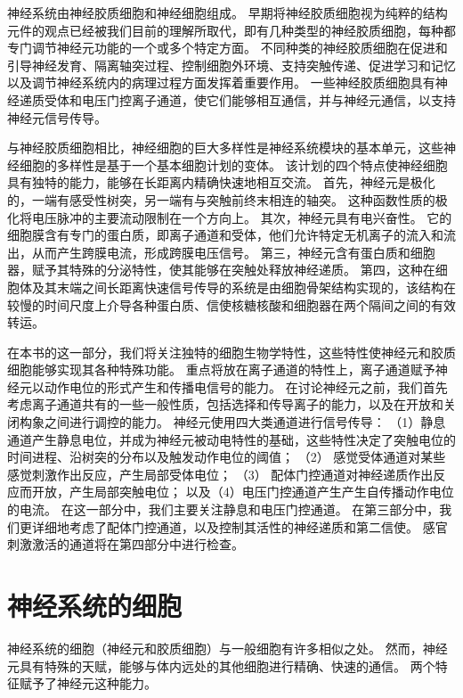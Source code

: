 神经系统由神经胶质细胞和神经细胞组成。
早期将神经胶质细胞视为纯粹的结构元件的观点已经被我们目前的理解所取代，即有几种类型的神经胶质细胞，每种都专门调节神经元功能的一个或多个特定方面。
不同种类的神经胶质细胞在促进和引导神经发育、隔离轴突过程、控制细胞外环境、支持突触传递、促进学习和记忆以及调节神经系统内的病理过程方面发挥着重要作用。
一些神经胶质细胞具有神经递质受体和电压门控离子通道，使它们能够相互通信，并与神经元通信，以支持神经元信号传导。


与神经胶质细胞相比，神经细胞的巨大多样性是神经系统模块的基本单元，这些神经细胞的多样性是基于一个基本细胞计划的变体。
该计划的四个特点使神经细胞具有独特的能力，能够在长距离内精确快速地相互交流。
首先，神经元是极化的，一端有感受性树突，另一端有与突触前终末相连的轴突。
这种函数性质的极化将电压脉冲的主要流动限制在一个方向上。
其次，神经元具有电兴奋性。
它的细胞膜含有专门的蛋白质，即离子通道和受体，他们允许特定无机离子的流入和流出，从而产生跨膜电流，形成跨膜电压信号。
第三，神经元含有蛋白质和细胞器，赋予其特殊的分泌特性，使其能够在突触处释放神经递质。
第四，这种在细胞体及其末端之间长距离快速信号传导的系统是由细胞骨架结构实现的，该结构在较慢的时间尺度上介导各种蛋白质、信使核糖核酸和细胞器在两个隔间之间的有效转运。


在本书的这一部分，我们将关注独特的细胞生物学特性，这些特性使神经元和胶质细胞能够实现其各种特殊功能。
重点将放在离子通道的特性上，离子通道赋予神经元以动作电位的形式产生和传播电信号的能力。
在讨论神经元之前，我们首先考虑离子通道共有的一些一般性质，包括选择和传导离子的能力，以及在开放和关闭构象之间进行调控的能力。
神经元使用四大类通道进行信号传导：
（1）静息通道产生静息电位，并成为神经元被动电特性的基础，这些特性决定了突触电位的时间进程、沿树突的分布以及触发动作电位的阈值；
（2） 感觉受体通道对某些感觉刺激作出反应，产生局部受体电位；
（3） 配体门控通道对神经递质作出反应而开放，产生局部突触电位；
以及（4）电压门控通道产生产生自传播动作电位的电流。
在这一部分中，我们主要关注静息和电压门控通道。
在第三部分中，我们更详细地考虑了配体门控通道，以及控制其活性的神经递质和第二信使。
感官刺激激活的通道将在第四部分中进行检查。




\chapter{神经系统的细胞} \label{chap:chap7}

神经系统的细胞（神经元和胶质细胞）与一般细胞有许多相似之处。
然而，神经元具有特殊的天赋，能够与体内远处的其他细胞进行精确、快速的通信。
两个特征赋予了神经元这种能力。


